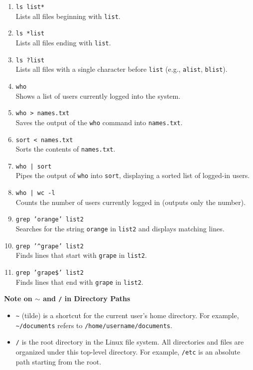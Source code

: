 \documentclass[a4paper]{article}
\begin{document}
\begin{enumerate}
\item \texttt{ls list*}\\
  Lists all files beginning with \texttt{list}.

\item \texttt{ls *list}\\
  Lists all files ending with \texttt{list}.

\item \texttt{ls ?list}\\
  Lists all files with a single character before \texttt{list} (e.g., \texttt{alist}, \texttt{blist}).

\item \texttt{who}\\
  Shows a list of users currently logged into the system.

\item \texttt{who > names.txt}\\
  Saves the output of the \texttt{who} command into \texttt{names.txt}.

\item \texttt{sort < names.txt}\\
  Sorts the contents of \texttt{names.txt}.

\item \texttt{who | sort}\\
  Pipes the output of \texttt{who} into \texttt{sort}, displaying a sorted list of logged-in users.

\item \texttt{who | wc -l}\\
  Counts the number of users currently logged in (outputs only the number).

\item \texttt{grep 'orange' list2}\\
  Searches for the string \texttt{orange} in \texttt{list2} and displays matching lines.

\item \texttt{grep '\^{}grape' list2}\\
  Finds lines that start with \texttt{grape} in \texttt{list2}.

\item \texttt{grep 'grape\$' list2}\\
  Finds lines that end with \texttt{grape} in \texttt{list2}.
\end{enumerate}
\noindent
\textbf{Note on \texttt{$\sim$} and \texttt{/} in Directory Paths}
\begin{itemize}
\item \texttt{\~{}} (tilde) is a shortcut for the current user's home directory. For example, \texttt{\~{}/documents} refers to \texttt{/home/username/documents}.
\item \texttt{/} is the root directory in the Linux file system. All directories and files are organized under this top-level directory. For example, \texttt{/etc} is an absolute path starting from the root.
\end{itemize}
\end{document}
